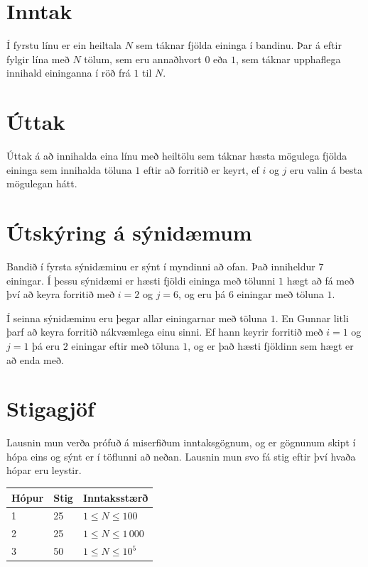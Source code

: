 \section*{Inntak}
Í fyrstu línu er ein heiltala $N$ sem táknar fjölda eininga í bandinu. Þar
á eftir fylgir lína með $N$ tölum, sem eru annaðhvort $0$ eða $1$, sem táknar
upphaflega innihald eininganna í röð frá $1$ til $N$.

\section*{Úttak}
Úttak á að innihalda eina línu með heiltölu sem táknar hæsta mögulega fjölda
eininga sem innihalda töluna $1$ eftir að forritið er keyrt, ef $i$ og $j$ eru
valin á besta mögulegan hátt.

\section*{Útskýring á sýnidæmum}
Bandið í fyrsta sýnidæminu er sýnt í myndinni að ofan. Það inniheldur $7$
einingar. Í þessu sýnidæmi er hæsti fjöldi eininga með tölunni $1$ hægt að fá
með því að keyra forritið með $i=2$ og $j=6$, og eru þá $6$ einingar með töluna
$1$.

Í seinna sýnidæminu eru þegar allar einingarnar með töluna $1$. En Gunnar litli
þarf að keyra forritið nákvæmlega einu sinni. Ef hann keyrir forritið með $i=1$
og $j=1$ þá eru $2$ einingar eftir með töluna $1$, og er það hæsti fjöldinn
sem hægt er að enda með.

\section*{Stigagjöf}
Lausnin mun verða prófuð á miserfiðum inntaksgögnum, og er gögnunum skipt í
hópa eins og sýnt er í töflunni að neðan. Lausnin mun svo fá stig eftir því
hvaða hópar eru leystir.

\begin{tabular}{|l|l|l|}
\hline
Hópur & Stig & Inntaksstærð \\ \hline
1     & 25 & $ 1 \leq N \leq 100$ \\ \hline
2     & 25 & $ 1 \leq N \leq 1\,000$ \\ \hline
3     & 50 & $ 1 \leq N \leq 10^5$ \\ \hline
\end{tabular}

